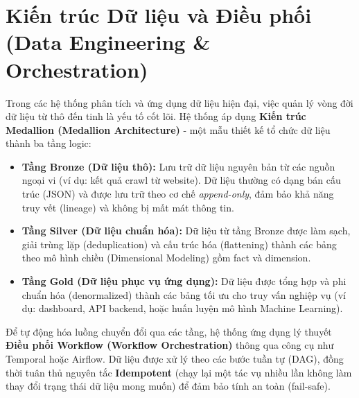 \section{Kiến trúc Dữ liệu và Điều phối (Data Engineering \& Orchestration)}
Trong các hệ thống phân tích và ứng dụng dữ liệu hiện đại, việc quản lý vòng đời dữ liệu từ thô đến tinh là yếu tố cốt lõi. Hệ thống áp dụng \textbf{Kiến trúc Medallion (Medallion Architecture)} - một mẫu thiết kế tổ chức dữ liệu thành ba tầng logic:
\begin{itemize}
    \item \textbf{Tầng Bronze (Dữ liệu thô):} Lưu trữ dữ liệu nguyên bản từ các nguồn ngoại vi (ví dụ: kết quả crawl từ website). Dữ liệu thường có dạng bán cấu trúc (JSON) và được lưu trữ theo cơ chế \textit{append-only}, đảm bảo khả năng truy vết (lineage) và không bị mất mát thông tin.
    \item \textbf{Tầng Silver (Dữ liệu chuẩn hóa):} Dữ liệu từ tầng Bronze được làm sạch, giải trùng lặp (deduplication) và cấu trúc hóa (flattening) thành các bảng theo mô hình chiều (Dimensional Modeling) gồm fact và dimension.
    \item \textbf{Tầng Gold (Dữ liệu phục vụ ứng dụng):} Dữ liệu được tổng hợp và phi chuẩn hóa (denormalized) thành các bảng tối ưu cho truy vấn nghiệp vụ (ví dụ: dashboard, API backend, hoặc huấn luyện mô hình Machine Learning).
\end{itemize}

Để tự động hóa luồng chuyển đổi qua các tầng, hệ thống ứng dụng lý thuyết \textbf{Điều phối Workflow (Workflow Orchestration)} thông qua công cụ như Temporal hoặc Airflow. Dữ liệu được xử lý theo các bước tuần tự (DAG), đồng thời tuân thủ nguyên tắc \textbf{Idempotent} (chạy lại một tác vụ nhiều lần không làm thay đổi trạng thái dữ liệu mong muốn) để đảm bảo tính an toàn (fail-safe).

